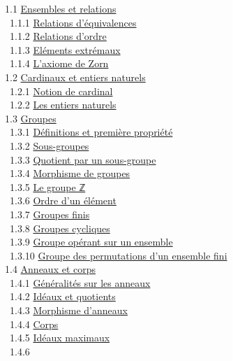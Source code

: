 \documentclass[]{article}
\begin{document}
~1.1 \href{coursse1.html\#x5-70001.1}{Ensembles et relations} \\ ~~1.1.1
\href{coursse1.html\#x5-80001.1.1}{Relations d'équivalences} \\ ~~1.1.2
\href{coursse1.html\#x5-90001.1.2}{Relations d'ordre} \\ ~~1.1.3
\href{coursse1.html\#x5-100001.1.3}{Eléments extrémaux} \\ ~~1.1.4
\href{coursse1.html\#x5-110001.1.4}{L'axiome de Zorn} \\ ~1.2
\href{coursse2.html\#x6-120001.2}{Cardinaux et entiers naturels} \\
~~1.2.1 \href{coursse2.html\#x6-130001.2.1}{Notion de cardinal} \\
~~1.2.2 \href{coursse2.html\#x6-140001.2.2}{Les entiers naturels} \\
~1.3 \href{coursse3.html\#x7-150001.3}{Groupes} \\ ~~1.3.1
\href{coursse3.html\#x7-160001.3.1}{Définitions et première propriété}
\\ ~~1.3.2 \href{coursse3.html\#x7-170001.3.2}{Sous-groupes} \\ ~~1.3.3
\href{coursse3.html\#x7-180001.3.3}{Quotient par un sous-groupe} \\
~~1.3.4 \href{coursse3.html\#x7-190001.3.4}{Morphisme de groupes} \\
~~1.3.5 \href{coursse3.html\#x7-200001.3.5}{Le groupe ℤ} \\ ~~1.3.6
\href{coursse3.html\#x7-210001.3.6}{Ordre d'un élément} \\ ~~1.3.7
\href{coursse3.html\#x7-220001.3.7}{Groupes finis} \\ ~~1.3.8
\href{coursse3.html\#x7-230001.3.8}{Groupes cycliques} \\ ~~1.3.9
\href{coursse3.html\#x7-240001.3.9}{Groupe opérant sur un ensemble} \\
~~1.3.10 \href{coursse3.html\#x7-250001.3.10}{Groupe des permutations
d'un ensemble fini} \\ ~1.4 \href{coursse4.html\#x8-260001.4}{Anneaux et
corps} \\ ~~1.4.1 \href{coursse4.html\#x8-270001.4.1}{Généralités sur
les anneaux} \\ ~~1.4.2 \href{coursse4.html\#x8-280001.4.2}{Idéaux et
quotients} \\ ~~1.4.3 \href{coursse4.html\#x8-290001.4.3}{Morphisme
d'anneaux} \\ ~~1.4.4 \href{coursse4.html\#x8-300001.4.4}{Corps} \\
~~1.4.5 \href{coursse4.html\#x8-310001.4.5}{Idéaux maximaux} \\ ~~1.4.6
\end{document}
